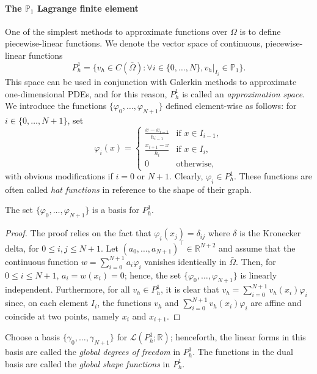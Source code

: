 \paragraph{\texorpdfstring{The $\mathbb{P}_1$ Lagrange finite element}{The P1 Lagrange finite element}}
One of the simplest methods to approximate functions over $\Omega$ is to define piecewise-linear functions. We denote the vector space of continuous, piecewise-linear functions
\begin{equation}
    P_h^1 = \{ v_h \in C(\bar{\Omega}): \forall i \in \{0, \dots, N\}, v_h|_{I_i} \in \mathbb{P}_1 \}.
\end{equation}
This space can be used in conjunction with Galerkin methods to approximate one-dimensional PDEs, and for this reason, $P_h^1$ is called an \emph{approximation space}. We introduce the functions $\{\varphi_0, \dots, \varphi_{N+1}\}$ defined element-wise as follows: for $i \in \{0, \dots, N+1\}$, set
\begin{equation}
    \varphi_i(x) = \begin{cases} \frac{x - x_{i-1}}{h_{i-1}} & \text{if } x \in I_{i-1}, \\ \frac{x_{i+1} - x}{h_i} & \text{if } x \in I_i, \\ 0 & \text{otherwise}, \end{cases}
\end{equation}
with obvious modifications if $i = 0$ or $N+1$. Clearly, $\varphi_i \in P_h^1$. These functions are often called \emph{hat functions} in reference to the shape of their graph.
\begin{lemma}\label{lemma:hatbasis}
    The set $\{\varphi_0, \dots, \varphi_{N+1}\}$ is a basis for $P_h^1$.
    \begin{proof}
        The proof relies on the fact that $\varphi_i(x_j) = \delta_{ij}$ where $\delta$ is the Kronecker delta, for $0 \le i,j \le N+1$. Let $(a_0, \dots, a_{N+1})^\top \in \mathbb{R}^{N+2}$ and assume that the continuous function $w = \sum_{i=0}^{N+1} a_i \varphi_i$ vanishes identically in $\bar{\Omega}$. Then, for $0 \le i \le N+1$, $a_i = w(x_i) = 0$; hence, the set $\{\varphi_0, \dots, \varphi_{N+1}\}$ is linearly independent. Furthermore, for all $v_h \in P_h^1$, it is clear that $v_h = \sum_{i=0}^{N+1} v_h(x_i) \varphi_i$ since, on each element $I_i$, the functions $v_h$ and $\sum_{i=0}^{N+1} v_h(x_i) \varphi_i$ are affine and coincide at two points, namely $x_i$ and $x_{i+1}$.
    \end{proof}
\end{lemma}
\begin{definition}\label{def:global-shape-functions}
    Choose a basis $\{\gamma_0, \dots, \gamma_{N+1}\}$ for $\mathcal{L}(P_h^1;\mathbb{R})$; henceforth, the linear forms in this basis are called the \emph{global degrees of freedom} in $P_h^1$. The functions in the dual basis are called the \emph{global shape functions} in $P_h^1$. 
\end{definition}

